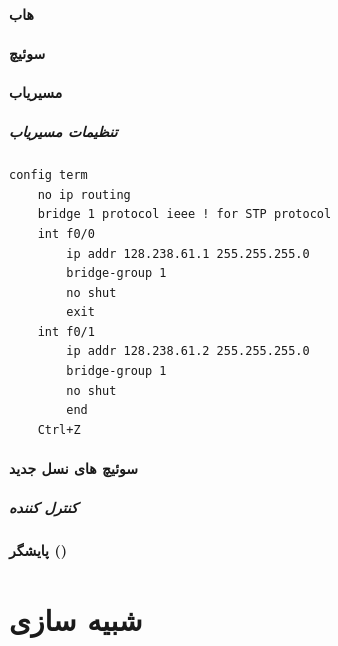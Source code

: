 \documentclass{../UTNetLabFa}
\begin{document}
\subsection{هاب}
\subsection{سوئیچ}
\subsection{مسیریاب}
\subsubsection{تنظیمات مسیریاب}
{
\begin{lstlisting}[language=cisco,caption=\FR{تنظیمات مسیریاب}]
config term
	no ip routing
	bridge 1 protocol ieee ! for STP protocol
	int f0/0
		ip addr 128.238.61.1 255.255.255.0
		bridge-group 1
		no shut
		exit
	int f0/1
		ip addr 128.238.61.2 255.255.255.0
		bridge-group 1
		no shut
		end
	Ctrl+Z
\end{lstlisting}
}
\subsection{سوئیچ های نسل جدید}
\subsubsection{کنترل کننده}
\subsection{پایشگر ()}

\part{شبیه سازی}
\end{document}
